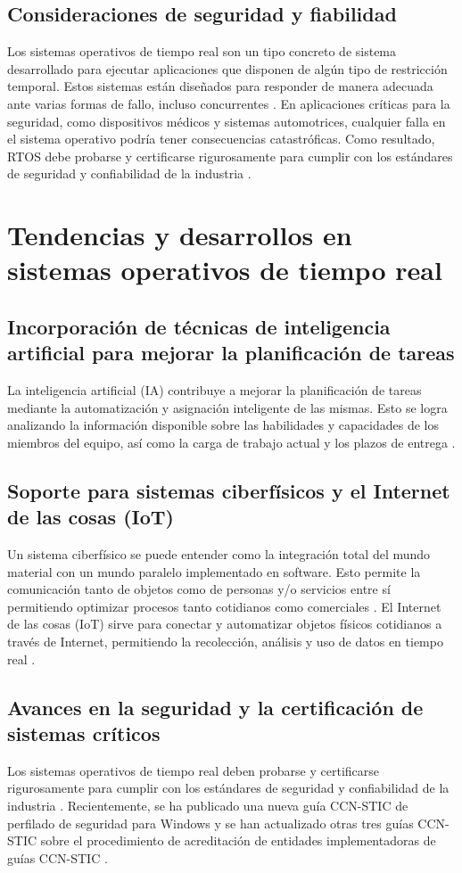 \documentclass{article}
\begin{document}
\subsection{Consideraciones de seguridad y fiabilidad}
Los sistemas operativos de tiempo real son un tipo concreto de sistema desarrollado para ejecutar aplicaciones que disponen 
de algún tipo de restricción temporal. Estos sistemas están diseñados para responder de manera adecuada ante varias formas de 
fallo, incluso concurrentes \cite{ref10}. En aplicaciones críticas para la seguridad, como dispositivos médicos y sistemas automotrices, 
cualquier falla en el sistema operativo podría tener consecuencias catastróficas. Como resultado, RTOS debe probarse y certificarse 
rigurosamente para cumplir con los estándares de seguridad y confiabilidad de la industria \cite{ref12}.


\section{Tendencias y desarrollos en sistemas operativos de tiempo real}

\subsection{Incorporación de técnicas de inteligencia artificial para mejorar la planificación de tareas}
La inteligencia artificial (IA) contribuye a mejorar la planificación de tareas mediante la automatización y asignación inteligente 
de las mismas. Esto se logra analizando la información disponible sobre las habilidades y capacidades de los miembros del equipo, así 
como la carga de trabajo actual y los plazos de entrega \cite{ref13}.

\subsection{Soporte para sistemas ciberfísicos y el Internet de las cosas (IoT)}
Un sistema ciberfísico se puede entender como la integración total del mundo material con un mundo paralelo implementado en software. 
Esto permite la comunicación tanto de objetos como de personas y/o servicios entre sí permitiendo optimizar procesos tanto cotidianos 
como comerciales \cite{ref14}. El Internet de las cosas (IoT) sirve para conectar y automatizar objetos físicos cotidianos a través de Internet, 
permitiendo la recolección, análisis y uso de datos en tiempo real \cite{ref15}.

\subsection{Avances en la seguridad y la certificación de sistemas críticos}
Los sistemas operativos de tiempo real deben probarse y certificarse rigurosamente para cumplir con los estándares de seguridad y 
confiabilidad de la industria \cite{ref12}. Recientemente, se ha publicado una nueva guía CCN-STIC de perfilado de seguridad para Windows y se han 
actualizado otras tres guías CCN-STIC sobre el procedimiento de acreditación de entidades implementadoras de guías CCN-STIC \cite{ref3}.
\end{document}
